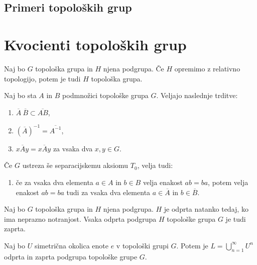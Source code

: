 \documentclass[mat1]{fmfdelo}
\newcommand{\closure}[1]{\overline{#1}}
\begin{document}
\subsection{Primeri topoloških grup}




\section{Kvocienti topoloških grup}

\begin{trditev}\label{trd:toppodgrupa}
Naj bo $G$ topološka grupa in $H$ njena podgrupa. Če $H$ opremimo z relativno topologijo, potem je tudi $H$ topološka grupa.
\end{trditev}

\begin{trditev}\label{trd:zaprtost}
Naj bo sta $A$ in $B$ podmnožici topološke grupa $G$. Veljajo naslednje trditve:
\begin{enumerate}
\item $\closure{A}\ \closure{B} \subset \closure{A B}$,
\item $(\closure{A})^{-1} = \closure{A^{-1}}$,
\item $x \closure{A} y = \closure{x A y}$ za vsaka dva $x, y \in G$.
\end{enumerate}

Če $G$ ustreza še separacijskemu aksiomu $T_0$, velja tudi:
\begin{enumerate}[resume]
\item če za vsaka dva elementa $a \in A$ in $b \in B$ velja enakost $ab = ba$, potem velja enakost $ab = ba$ tudi za vsaka dva elementa $a \in \closure{A}$ in $b \in \closure{B}$.
\end{enumerate}
\end{trditev}

\begin{trditev}\label{trd:odpzap}
Naj bo $G$ topološka grupa in $H$ njena podgrupa. $H$ je odprta natanko tedaj, ko ima neprazno notranjost. Vsaka odprta podgrupa $H$ topološke grupa $G$ je tudi zaprta.
\end{trditev}

\begin{trditev}\label{trd:podgrupaunija}
Naj bo $U$ simetrična okolica enote $e$ v topološki grupi $G$. Potem je $L = \bigcup_{n=1}^{\infty} U^n$ odprta in zaprta podgrupa topološke grupe $G$.
\end{trditev}
\end{document}
